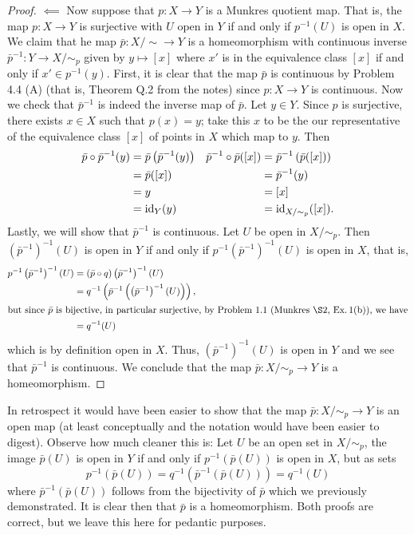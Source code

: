 \begin{proof}
$\impliedby$ Now suppose that $p\colon X\to Y$ is a Munkres
quotient map. That is, the map $p\colon X\to Y$ is surjective
with $U$ open in $Y$ if and only if $p^{-1}(U)$ is open in
$X$. We claim that he map $\bar p\colon X/{\sim}\to Y$ is a
homeomorphism with continuous inverse $\bar p^{-1}\colon Y\to
X/{\sim_p}$ given by $y\mapsto[x]$ where $x'$ is in the equivalence
class $[x]$ if and only if $x'\in p^{-1}(y)$. First,
it is clear that the map $\bar p$ is continuous by Problem 4.4
(A) (that is, Theorem Q.2 from the notes) since $p\colon X\to Y$
is continuous. Now we check that $\bar p^{-1}$ is indeed the
inverse map of $\bar p$. Let $y\in Y$. Since $p$ is surjective,
there exists $x\in X$ such that $p(x)=y$; take this $x$ to be the
our representative of the equivalence class $[x]$ of points in
$X$ which map to $y$. Then
\begin{align*}
\bar p\circ \bar p^{-1}(y)
&=
\bar p\left(\bar p^{-1}(y)\right)
&
\bar p^{-1}\circ\bar p([x])
&=\bar p^{-1}\left(\bar p([x])\right)
\\
&=
\bar p([x])
&
&=\bar p^{-1}(y)
\\
&=y
&
&=[x]
\\
&=\operatorname{id}_Y(y)
&
&=\operatorname{id}_{X/{\sim_p}}([x]).
\end{align*}
Lastly, we will show that $\bar p^{-1}$ is continuous. Let $U$ be
open in $X/{\sim_p}$. Then $\left(\bar p^{-1}\right)^{-1}(U)$ is
open in $Y$ if and only if $p^{-1}\left(\bar
  p^{-1}\right)^{-1}(U)$ is open in $X$, that is,
\begin{align*}
p^{-1}\left(\bar p^{-1}\right)^{-1}(U)
&=\left(\bar p\circ q\right)\left(\bar p^{-1}\right)^{-1}(U)\\
&=q^{-1}\left(\bar p^{-1}\left(\left(\bar p^{-1}\right)^{-1}(U)\right)\right),\\
\shortintertext{but since $\bar p$ is bijective, in particular
  surjective, by Problem 1.1 (Munkres \S2, Ex.\,1(b)), we have}
&=q^{-1}(U)
\end{align*}
which is by definition open in $X$. Thus, $\left(\bar
  p^{-1}\right)^{-1}(U)$ is open in $Y$ and we see that
$\bar p^{-1}$ is continuous. We conclude that the map $\bar
p\colon X/{\sim_p}\to Y$ is a homeomorphism.
\end{proof}
\begin{remarks*}
In retrospect it would have been easier to show that the map
$\bar p\colon X/{\sim_p}\to Y$ is an open map (at least
conceptually and the notation would have been easier to
digest). Observe how much cleaner this is: Let $U$ be an open set
in $X/{\sim_p}$, the image $\bar p(U)$ is open in $Y$ if and only
if $p^{-1}(\bar p(U))$ is open in $X$, but as sets
\[
p^{-1}(\bar p(U))=q^{-1}\left(\bar p^{-1}\left(\bar p(U)\right)\right)=q^{-1}(U)
\]
where $\bar p^{-1}\left(\bar p(U)\right)$ follows from the
bijectivity of $\bar p$ which we previously demonstrated. It is
clear then that $\bar p$ is a homeomorphism. Both proofs are
correct, but we leave this here for pedantic purposes.
\end{remarks*}
